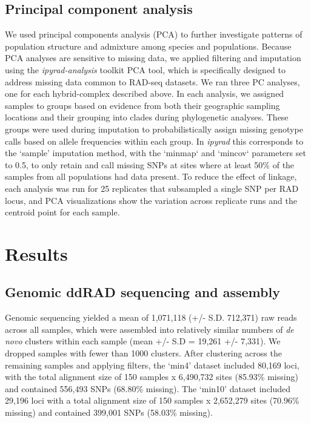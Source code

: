 \documentclass[11pt]{article}
\begin{document}
\subsection{Principal component analysis}
We used principal components analysis (PCA) to further investigate patterns of
population structure and admixture among species and populations. Because PCA 
analyses are sensitive to missing data, we applied filtering and imputation 
using the \emph{ipyrad-analysis} toolkit PCA tool, which is specifically 
designed to address missing data common to RAD-seq datasets. 
% 
We ran three PC analyses, one for each hybrid-complex described above. 
In each analysis, we assigned samples to groups based on evidence from 
both their geographic sampling locations and their grouping into clades 
during phylogenetic analyses. These groups were used during imputation to 
probabilistically assign missing genotype calls based on allele frequencies
within each group. 
In \emph{ipyrad} this corresponds to the ‘sample’ imputation
method, with the ‘minmap` and ‘mincov` parameters set to 0.5, to only retain 
and call missing SNPs at sites where at least 50\% of the samples from all 
populations had data present. 
To reduce the effect of linkage, each analysis was run for 25 replicates
that subsampled a single SNP per RAD locus, and PCA visualizations show 
the variation across replicate runs and the centroid point for each sample.



\section{Results}
\subsection{Genomic ddRAD sequencing and assembly}
Genomic sequencing yielded a mean of 1,071,118 (+/- S.D. 712,371) raw reads 
across all samples, which were assembled into relatively similar numbers of 
\emph{de novo} clusters within each sample (mean +/- S.D = 19,261 +/- 7,331). 
% 
We dropped samples with fewer than 1000 clusters. 
After clustering across the remaining samples and applying filters, 
the `min4' dataset included 80,169 loci, with the total alignment size of
150 samples x 6,490,732 sites (85.93\% missing) and contained 556,493 
SNPs (68.80\% missing). 
The `min10' dataset included 29,196 loci with a total alignment size of 
150 samples x 2,652,279 sites (70.96\% missing) and contained 399,001 SNPs
(58.03\% missing).
\end{document}
